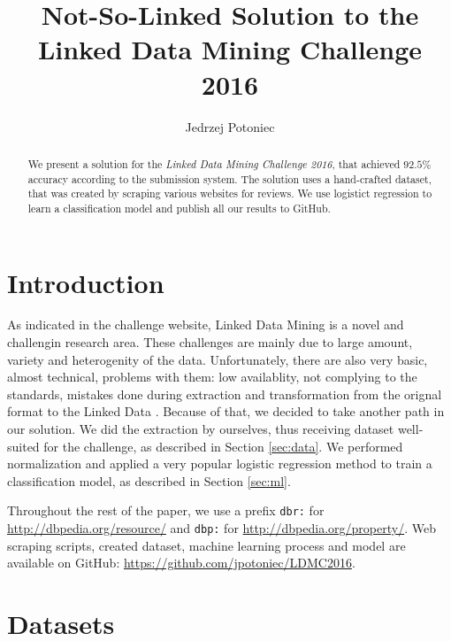 \documentclass{llncs}
\begin{document}
\title{Not-So-Linked Solution to the Linked Data Mining Challenge 2016}
\author{Jedrzej Potoniec}

\maketitle

\begin{abstract}
We present a solution for the \emph{Linked Data Mining Challenge 2016}, that achieved $92.5\%$ accuracy according to the submission system.
The solution uses a hand-crafted dataset, that was created by scraping various websites for reviews.
We use logistict regression to learn a classification model and publish all our results to GitHub.
\end{abstract}


\section{Introduction}

As indicated in the challenge website, Linked Data Mining is a novel and challengin research area.
These challenges are mainly due to large amount, variety and heterogenity of the data.
Unfortunately, there are also very basic, almost technical, problems with them: low availablity, not complying to the standards, mistakes done during extraction and transformation from the orignal format to the Linked Data \cite{lodlaudromat}.
Because of that, we decided to take another path in our solution.
We did the extraction by ourselves, thus receiving dataset well-suited for the challenge, as described in Section \ref{sec:data}.
We performed normalization and applied a very popular logistic regression method to train a classification model, as described in Section \ref{sec:ml}.

Throughout the rest of the paper, we use a prefix \texttt{dbr:} for \url{http://dbpedia.org/resource/} and \texttt{dbp:} for \url{http://dbpedia.org/property/}.
Web scraping scripts, created dataset, machine learning process and model are available on GitHub: \url{https://github.com/jpotoniec/LDMC2016}.

\section{Datasets\label{sec:data}}
\end{document}
